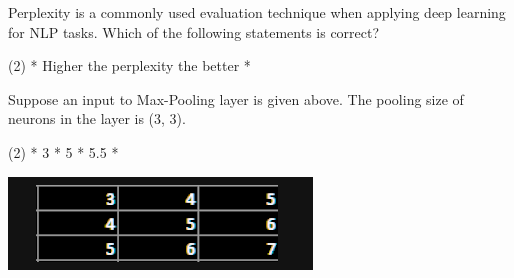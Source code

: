 \documentclass[10pt]{extarticle}
\begin{document}
\begin{exercise}
    Perplexity is a commonly used evaluation technique when applying deep learning for NLP tasks. Which of the following statements is correct?
    \begin{choice} (2)
        * Higher the perplexity the better
        *
    \end{choice}
\end{exercise}
\begin{solution}
\end{solution}

\begin{exercise}
    \begin{minipage}[t]{.6\textwidth}
    Suppose an input to Max-Pooling layer is given above. The pooling size of neurons in the layer is (3, 3).
        \begin{choice} (2)
            * 3
            * 5
            * 5.5
            *
        \end{choice}
    \end{minipage}
    \begin{minipage}[t]{.3\textwidth}
        \vspace*{0pt}
        \includegraphics{Q_table}
    \end{minipage}
\end{exercise}
\begin{solution}
\end{solution}
\end{document}
